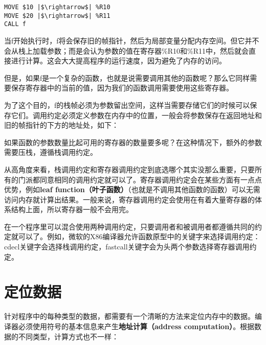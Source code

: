 \documentclass[cn,11pt,chinese]{elegantbook}
\begin{document}
\begin{verbatim}
MOVE $10 |$\rightarrow$| %R10
MOVE $20 |$\rightarrow$| %R11
CALL f
\end{verbatim}

当f开始执行时，f将会保存旧的帧指针，然后为局部变量分配内存空间。但它并不会从栈上加载参数；而是会认为参数的值在寄存器\%R10和\%R11中，然后就会直接进行计算。这会大大提高程序的运行速度，因为避免了内存的访问。

但是，如果f是一个复杂的函数，也就是说需要调用其他的函数呢？那么它同样需要保存寄存器中的当前的值，因为我们的函数调用需要使用这些寄存器。

为了这个目的，f的栈帧必须为参数留出空间，这样当需要存储它们的时候可以保存它们。调用约定必须定义参数在内存中的位置，一般会将参数保存在返回地址和旧的帧指针的下方的地址处，如下：

如果函数的参数数量比起可用的寄存器的数量要多呢？在这种情况下，额外的参数需要压栈，遵循栈调用约定。

从高角度来看，栈调用约定和寄存器调用约定到底选哪个其实没那么重要，只要所有的门派都同意相同的调用约定就可以了。寄存器调用约定会在某些方面有一点点优势，例如\textbf{leaf function（叶子函数）}（也就是不调用其他函数的函数）可以无需访问内存就计算出结果。一般来说，寄存器调用约定会使用在有着大量寄存器的体系结构上面，所以寄存器一般不会用完。

在一个程序里可以混合使用两种调用约定，只要调用者和被调用者都遵循共同的约定就可以了。例如，微软的X86编译器允许函数原型中的关键字来选择调用约定：cdecl关键字会选择栈调用约定，fastcall关键字会为头两个参数选择寄存器调用约定。

\section{定位数据}

针对程序中的每种类型的数据，都需要有一个清晰的方法来定位内存中的数据。编译器必须使用符号的基本信息来产生\textbf{地址计算（address computation）}。根据数据的不同类型，计算方式也不一样：
\end{document}

